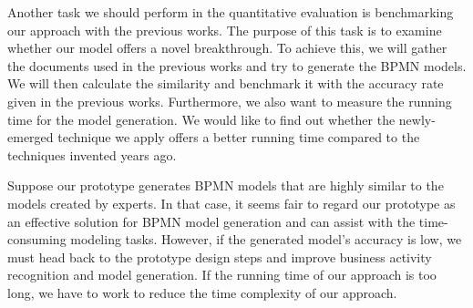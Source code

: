 Another task we should perform in the quantitative evaluation is benchmarking our approach with the previous works. The purpose of this task is to examine whether our model offers a novel breakthrough. To achieve this, we will gather the documents used in the previous works and try to generate the BPMN models. We will then calculate the similarity and benchmark it with the accuracy rate given in the previous works. Furthermore, we also want to measure the running time for the model generation. We would like to find out whether the newly-emerged technique we apply offers a better running time compared to the techniques invented years ago. 

 Suppose our prototype generates BPMN models that are highly similar to the models created by experts. In that case, it seems fair to regard our prototype as an effective solution for BPMN model generation and can assist with the time-consuming modeling tasks. However, if the generated model's accuracy is low, we must head back to the prototype design steps and improve business activity recognition and model generation. If the running time of our approach is too long, we have to work to reduce the time complexity of our approach.